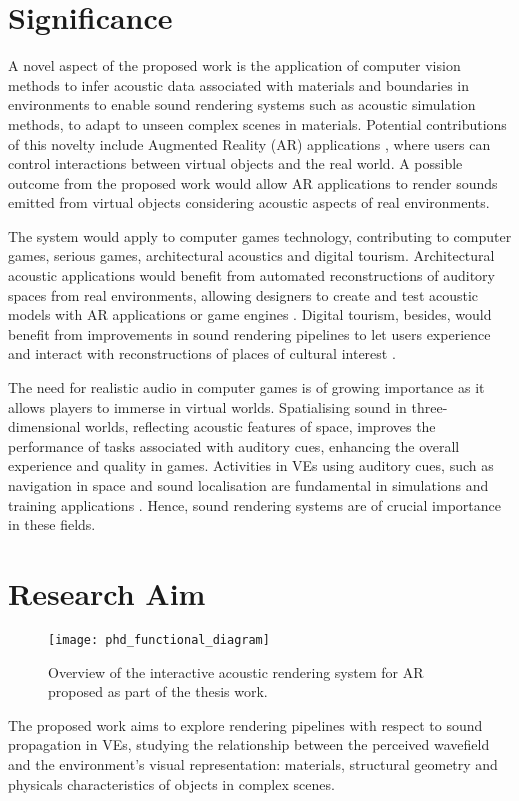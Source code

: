 \section{Significance}
A novel aspect of the proposed work is the application of computer vision methods to infer acoustic data associated with materials and boundaries in environments to enable sound rendering systems such as acoustic simulation methods, to adapt to unseen complex scenes in materials.
Potential contributions of this novelty include Augmented Reality (AR) applications \citep{liu2018technical}, where users can control interactions between virtual objects and the real world. A possible outcome from the proposed work would allow AR applications to render sounds emitted from virtual objects considering acoustic aspects of real environments. \par
The system would apply to computer games technology, contributing to computer games, serious games, architectural acoustics and digital tourism. 
Architectural acoustic applications would benefit from automated reconstructions of auditory spaces from real environments, allowing designers to create and test acoustic models with AR applications or game engines \citep{berardi2016acoustic}. Digital tourism, besides, would benefit from improvements in sound rendering pipelines to let users experience and interact with reconstructions of places of cultural interest \citep{schofield2018viking}. \par
The need for realistic audio in computer games is of growing importance as it allows players to immerse in virtual worlds. Spatialising sound in three-dimensional worlds, reflecting acoustic features of space, improves the performance of tasks associated with auditory cues, enhancing the overall experience and quality in games. 
Activities in VEs using auditory cues, such as navigation in space and sound localisation are fundamental in simulations and training applications \citep{lokki2005navigation}. Hence, sound rendering systems are of crucial importance in these fields.

\section{Research Aim}
\begin{figure}[htbp]
    \centering
    \texttt{[image: phd\_functional\_diagram]}
    \caption{Overview of the interactive acoustic rendering system for AR proposed as part of the thesis work.}
    \label{fig:proposed-system-diagram}
\end{figure}
The proposed work aims to explore rendering pipelines with respect to sound propagation in VEs, studying the relationship between the perceived wavefield and the environment’s visual representation: materials, structural geometry and physicals characteristics of objects in complex scenes.



